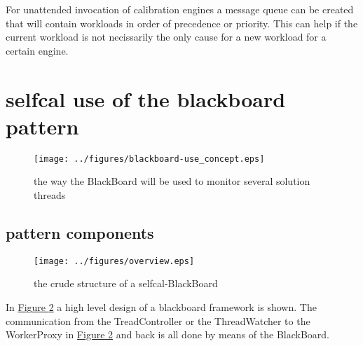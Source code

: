 \documentclass[]{lofar}
\begin{document}
    For unattended invocation of calibration engines a message queue
    can be created that will contain workloads in order of precedence
    or priority. This can help if the current workload is not
    necissarily the only cause for a new workload for a certain
    engine.

  \section{selfcal use of the blackboard pattern}
  \label{sec:selfcal-use-blackboard}
  \begin{figure}
    \texttt{[image: ../figures/blackboard-use\_concept.eps]}
    \hypertarget{fig:blackboard-use}{}
    \caption{the way the BlackBoard will be used to monitor several
    solution threads\label{fig:blackboard-use}}
  \end{figure}

    \subsection{pattern components}
    \label{subsec:pattern-components}

      \begin{figure}
        \texttt{[image: ../figures/overview.eps]}
        \hypertarget{fig:overview}{}
        \caption{the crude structure of a selfcal-BlackBoard\label{fig:overview}}
      \end{figure}

      In \hyperlink{fig:overview}{Figure \ref{fig:overview}} a high
      level design of a blackboard framework is shown. The
      communication from the TreadController or the ThreadWatcher to
      the WorkerProxy in \hyperlink{fig:overview}{Figure
      \ref{fig:overview}} and back is all done by means of the
      BlackBoard.
\end{document}
